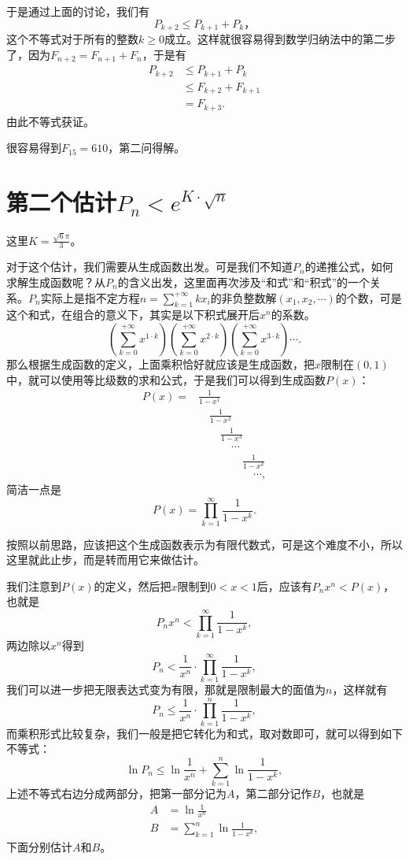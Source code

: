 \documentclass[cn]{elegantbook}
\begin{document}
于是通过上面的讨论，我们有
\[
P_{k+2} \le P_{k+1} + P_k，
\]
这个不等式对于所有的整数$k \ge 0$成立。这样就很容易得到数学归纳法中的第二步了，因为$F_{n+2} = F_{n+1}+ F_n$，于是有
\[
\begin{aligned}
P_{k+2} &\le P_{k+1} + P_k \\
&\le F_{k+2} + F_{k+1}\\
&=F_{k+3}.
\end{aligned}
\]
由此不等式获证。

很容易得到$F_{15}=610$，第二问得解。


\section{第二个估计$P_n < e^{K\cdot \sqrt{n}}$}
这里$K=\frac{\sqrt{6}\pi}{3}$。

对于这个估计，我们需要从生成函数出发。可是我们不知道$P_n$的递推公式，如何求解生成函数呢？从$P_n$的含义出发，这里面再次涉及“和式”和“积式”的一个关系。$P_n$实际上是指不定方程$n=\sum_{k=1}^{+\infty}{kx_i}$的非负整数解$(x_1, x_2, \cdots)$的个数，可是这个和式，在组合的意义下，其实是以下积式展开后$x^n$的系数。
\[
(\sum_{k=0}^{+\infty}{x^{1 \cdot k}})(\sum_{k=0}^{+\infty}{x^{2\cdot k}})(\sum_{k=0}^{+\infty}{x^{3\cdot k}})\cdots.
\]
那么根据生成函数的定义，上面乘积恰好就应该是生成函数，把$x$限制在$(0,1)$中，就可以使用等比级数的求和公式，于是我们可以得到生成函数$P(x)$：
\[
\begin{aligned}
P(x) = &\frac{1}{1 - x^{1}} \\
&\quad \frac{1}{1 - x^2} \\
&\quad\quad \frac{1}{1-x^3}\\
&\quad\quad\quad \cdots\\
&\quad\quad\quad\quad \frac{1}{1-x^k}\\
&\quad\quad\quad\quad\quad \cdots,
\end{aligned}
\]
简洁一点是
\[
P(x) = \prod_{k=1}^{\infty}{\frac{1}{1-x^k}}.
\]

按照以前思路，应该把这个生成函数表示为有限代数式，可是这个难度不小，所以这里就此止步，而是转而用它来做估计。

我们注意到$P(x)$的定义，然后把$x$限制到$0 < x < 1$后，应该有$P_nx^n < P(x)$，也就是
\[
P_nx^n < \prod_{k=1}^{\infty}{\frac{1}{1-x^k}},
\]
两边除以$x^n$得到
\[
P_n < \frac{1}{x^n} \cdot \prod_{k=1}^{\infty}{\frac{1}{1-x^k}},
\]
我们可以进一步把无限表达式变为有限，那就是限制最大的面值为$n$，这样就有
\[
P_n \le \frac{1}{x^n} \cdot \prod_{k=1}^{n}{\frac{1}{1-x^k}},
\]
而乘积形式比较复杂，我们一般是把它转化为和式，取对数即可，就可以得到如下不等式：
\[
\ln{P_n} \le \ln{\frac{1}{x^n}} + \sum_{k=1}^{n}{\ln{\frac{1}{1-x^k}}},
\]
上述不等式右边分成两部分，把第一部分记为$A$，第二部分记作$B$，也就是
\[
\begin{aligned}
A &=  \ln{\frac{1}{x^n}}\\
B &= \sum_{k=1}^{n}{\ln{\frac{1}{1-x^k}}},
\end{aligned}
\]
下面分别估计$A$和$B$。
\end{document}
